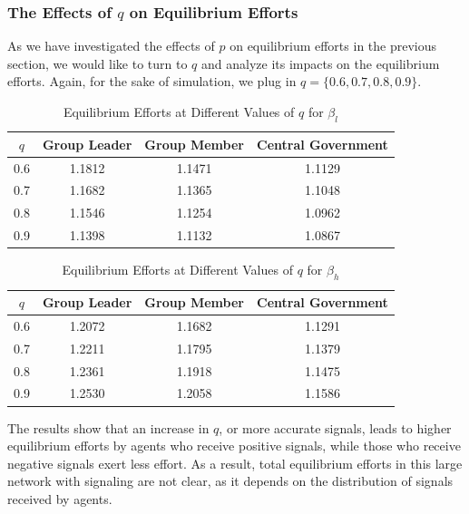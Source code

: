 \documentclass[12pt]{article}
\begin{document}
\subsubsection*{The Effects of $q$ on Equilibrium Efforts}
As we have investigated the effects of $p$ on equilibrium efforts in the previous section, we would like to turn to $q$ and analyze its impacts on the equilibrium efforts. Again, for the sake of simulation, we plug in $q = \{0.6,0.7,0.8,0.9\}$.\\
\begin{table}[H]
  \centering
  \caption{Equilibrium Efforts at Different Values of \( q \) for $\beta_l$}
  \begin{tabular}{c c c c}
  \toprule
  \textbf{\( q \)} & \textbf{Group Leader} & \textbf{Group Member} & \textbf{Central Government} \\
  \midrule
  0.6 & 1.1812 & 1.1471 & 1.1129 \\
  0.7 & 1.1682 & 1.1365 & 1.1048 \\
  0.8 & 1.1546 & 1.1254 & 1.0962 \\
  0.9 & 1.1398 & 1.1132 & 1.0867 \\
  \bottomrule
  \end{tabular}
  \end{table}
  \begin{table}[H]
    \centering
    \caption{Equilibrium Efforts at Different Values of \( q \) for $\beta_h$}
    \begin{tabular}{c c c c}
    \toprule
    \textbf{\( q \)} & \textbf{Group Leader} & \textbf{Group Member} & \textbf{Central Government} \\
    \midrule
    0.6 & 1.2072 & 1.1682 & 1.1291 \\
    0.7 & 1.2211 & 1.1795 & 1.1379 \\
    0.8 & 1.2361 & 1.1918 & 1.1475 \\
    0.9 & 1.2530 & 1.2058 & 1.1586 \\
    \bottomrule
    \end{tabular}
    \end{table}
The results show that an increase in $q$, or more accurate signals, leads to higher equilibrium efforts by agents who receive positive signals, while those who receive negative signals exert less effort. As a result, total equilibrium efforts in this large network with signaling are not clear, as it depends on the distribution of signals received by agents.\\    
   
\end{document}
